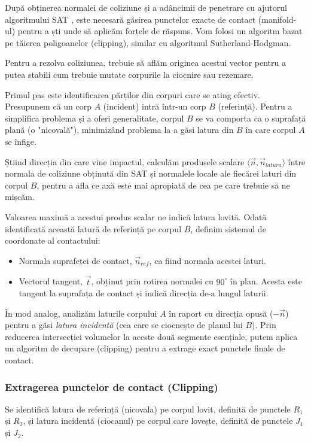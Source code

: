 \documentclass[12pt, a4paper]{article}
\begin{document}
După obținerea normalei de coliziune și a adâncimii de penetrare cu ajutorul algoritmului SAT , este necesară găsirea punctelor exacte de contact (manifold-ul) pentru a ști unde să aplicăm forțele de răspuns. Vom folosi un algoritm bazat pe tăierea poligoanelor (clipping), similar cu algoritmul Sutherland-Hodgman.

Pentru a rezolva coliziunea, trebuie să aflăm originea acestui vector pentru a putea stabili cum trebuie mutate corpurile la ciocnire sau rezemare.

Primul pas este identificarea părților din corpuri care se ating efectiv. Presupunem că un corp $A$ (incident) intră într-un corp $B$ (referință). Pentru a simplifica problema și a oferi generalitate, corpul $B$ se va comporta ca o suprafață plană (o "nicovală"), minimizând problema la a găsi latura din $B$ în care corpul $A$ se înfige.

Știind direcția din care vine impactul, calculăm produsele scalare $\langle \vec{n}, \vec{n}_{latura} \rangle$ între normala de coliziune obținută din SAT și normalele locale ale fiecărei laturi din corpul $B$, pentru a afla ce axă este mai apropiată de cea pe care trebuie să ne mișcăm. 

Valoarea maximă a acestui produs scalar ne indică latura lovită. Odată identificată această latură de referință pe corpul $B$, definim sistemul de coordonate al contactului:
\begin{itemize}
    \item Normala suprafeței de contact, $\vec{n}_{ref}$, ca fiind normala acestei laturi.
    \item Vectorul tangent, $\vec{t}$, obținut prin rotirea normalei cu $90^\circ$ în plan. Acesta este tangent la suprafața de contact și indică direcția de-a lungul laturii.
\end{itemize}

În mod analog, analizăm laturile corpului $A$ în raport cu direcția opusă ($-\vec{n}$) pentru a găsi \textit{latura incidentă} (cea care se ciocnește de planul lui $B$). Prin reducerea intersecției volumelor la aceste două segmente esențiale, putem aplica un algoritm de decupare (clipping) pentru a extrage exact punctele finale de contact.

\subsubsection{Extragerea punctelor de contact (Clipping)}

Se identifică latura de referință (nicovala) pe corpul lovit, definită de punctele $R_1$ și $R_2$, și latura incidentă (ciocanul) pe corpul care lovește, definită de punctele $J_1$ și $J_2$.
\end{document}
